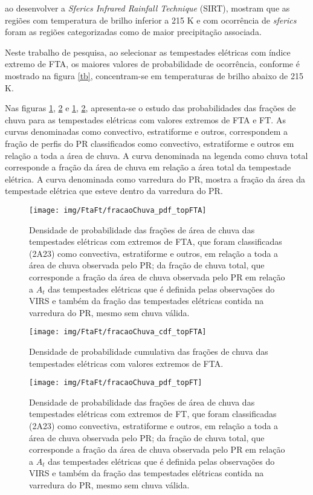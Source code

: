  ao desenvolver a \textit{Sferics Infrared Rainfall Technique} (SIRT), mostram que as regiões com temperatura de brilho inferior a 215 K e com ocorrência de \textit{sferics} foram as regiões categorizadas como de maior precipitação associada.

Neste trabalho de pesquisa, ao selecionar as tempestades elétricas com índice extremo de FTA, os maiores valores de probabilidade de ocorrência, conforme é mostrado na figura \ref{tb}, concentram-se em temperaturas de brilho abaixo de 215 K.


Nas figuras \ref{pdffracaoFTA}, \ref{cdffracaoFTA} e \ref{pdffracaoFTA},  \ref{cdffracaoFTA}, apresenta-se o estudo das probabilidades das frações de chuva para as tempestades elétricas com valores extremos de FTA e FT. As curvas denominadas como convectivo, estratiforme e outros, correspondem a fração de perfis do PR classificados como convectivo, estratiforme e outros em relação a toda a área de chuva. A curva denominada na legenda como chuva total corresponde a fração da área de chuva em relação a área total da tempestade elétrica. A curva denominada como varredura do PR, mostra a fração da área da tempestade elétrica que esteve dentro da varredura do PR.


\begin{figure}[!ht]
  \centering
  \texttt{[image: img/FtaFt/fracaoChuva\_pdf\_topFTA]}   
  \caption{Densidade de probabilidade das frações de área de chuva das tempestades elétricas com extremos de FTA, que foram classificadas (2A23) como convectiva, estratiforme e outros, em relação a toda a área de chuva observada pelo PR; da fração de chuva total, que corresponde a fração da área de chuva observada pelo PR em relação a $A_t$ das tempestades elétricas que é definida pelas observações do VIRS e também da fração das tempestades elétricas contida na varredura do PR, mesmo sem chuva válida.  }
  \label{pdffracaoFTA}  
\end{figure}

\begin{figure}[!ht]
  \centering 
  \texttt{[image: img/FtaFt/fracaoChuva\_cdf\_topFTA]}
  \caption{Densidade de probabilidade cumulativa das frações de chuva das tempestades elétricas com valores extremos de FTA.}
  \label{cdffracaoFTA}
\end{figure}


\begin{figure}[!ht]
  \centering
  \texttt{[image: img/FtaFt/fracaoChuva\_pdf\_topFT]}   
  \caption{Densidade de probabilidade das frações de área de chuva das tempestades elétricas com extremos de FT, que foram classificadas (2A23) como convectiva, estratiforme e outros, em relação a toda a área de chuva observada pelo PR; da fração de chuva total, que corresponde a fração da área de chuva observada pelo PR em relação a $A_t$ das tempestades elétricas que é definida pelas observações do VIRS e também da fração das tempestades elétricas contida na varredura do PR, mesmo sem chuva válida.}
  \label{pdffracaoFT}  
\end{figure}

